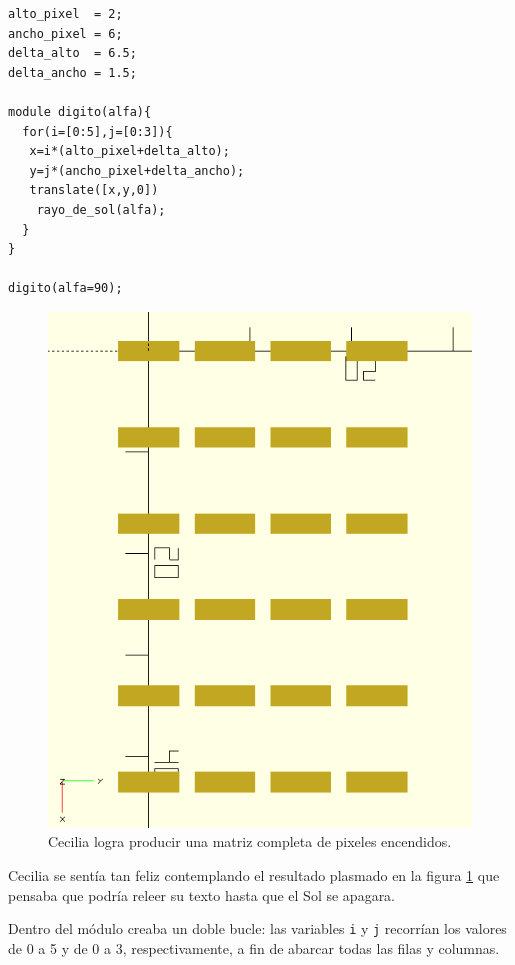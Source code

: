     \begin{lstlisting}
alto_pixel  = 2;
ancho_pixel = 6;      
delta_alto  = 6.5;
delta_ancho = 1.5;

module digito(alfa){
  for(i=[0:5],j=[0:3]){
   x=i*(alto_pixel+delta_alto);
   y=j*(ancho_pixel+delta_ancho);
   translate([x,y,0])
    rayo_de_sol(alfa);
  }
}

digito(alfa=90);
    \end{lstlisting}

    \begin{figure}[ht]
      \centering
    \includegraphics[width=.4\textwidth]{imagenes/matriz-completa}  
    \caption{Cecilia logra producir una matriz completa de pixeles
      encendidos.}
      \label{fig:matriz-completa}
    \end{figure}
    



    Cecilia se sentía tan feliz contemplando el resultado plasmado en
    la figura \ref{fig:matriz-completa} que pensaba que podría releer
    su texto hasta que el Sol se
    apagara. %

    Dentro del módulo creaba un doble bucle: las variables \texttt{i}
    y \texttt{j} recorrían los valores de 0 a 5 y de 0 a 3,
    respectivamente, a fin de abarcar todas las filas y columnas.

